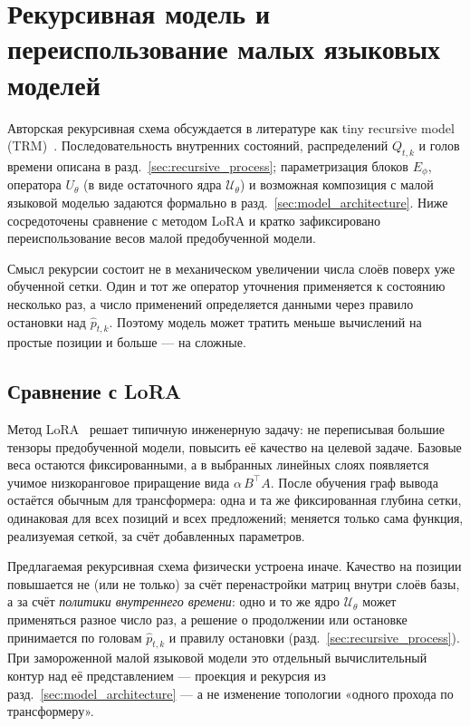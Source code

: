 \section{Рекурсивная модель и переиспользование малых языковых моделей}\label{sec:slm_reuse}

Авторская рекурсивная схема обсуждается в литературе как tiny recursive model (TRM)~\cite{trm}.
Последовательность внутренних состояний, распределений \(Q_{t,k}\) и голов времени описана в
разд.~\ref{sec:recursive_process}; параметризация блоков \(E_{\phi}\), оператора \(U_\theta\) (в
виде остаточного ядра \(\mathcal U_{\theta}\)) и возможная композиция с малой языковой моделью
задаются формально в разд.~\ref{sec:model_architecture}. Ниже сосредоточены сравнение с методом
LoRA и кратко зафиксировано переиспользование весов малой предобученной модели.

Смысл рекурсии состоит не в механическом увеличении числа слоёв поверх уже обученной сетки. Один и
тот же оператор уточнения применяется к состоянию несколько раз, а число применений определяется
данными через правило остановки над \(\widehat p_{t,k}\). Поэтому модель может тратить меньше
вычислений на простые позиции и больше --- на сложные.

\subsection{Сравнение с LoRA}

Метод LoRA~\cite{hu2021} решает типичную инженерную задачу: не переписывая большие тензоры
предобученной модели, повысить её качество на целевой задаче. Базовые веса остаются
фиксированными, а в выбранных линейных слоях появляется учимое низкоранговое приращение вида
\(\alpha\,B^{\top}A\). После обучения граф вывода остаётся обычным для трансформера: одна и та же
фиксированная глубина сетки, одинаковая для всех позиций и всех предложений; меняется только сама
функция, реализуемая сеткой, за счёт добавленных параметров.

Предлагаемая рекурсивная схема физически устроена иначе. Качество на позиции повышается не (или не
только) за счёт перенастройки матриц внутри слоёв базы, а за счёт \emph{политики внутреннего
времени}: одно и то же ядро \(\mathcal U_{\theta}\) может применяться разное число раз, а решение
о продолжении или остановке принимается по головам \(\widehat p_{t,k}\) и правилу остановки
(разд.~\ref{sec:recursive_process}). При замороженной малой языковой модели это отдельный
вычислительный контур над её представлением --- проекция и рекурсия из
разд.~\ref{sec:model_architecture} --- а не изменение топологии «одного прохода по трансформеру».

